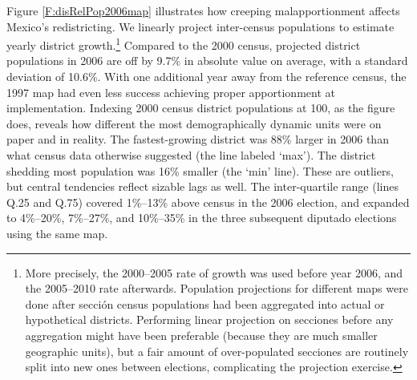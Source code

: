 \documentclass[letter,12pt]{article}
\begin{document}
Figure \ref{F:disRelPop2006map} illustrates how creeping malapportionment affects Mexico's redistricting. We linearly project inter-census populations to estimate yearly district growth.\footnote{More precisely, the 2000--2005 rate of growth was used before year 2006, and the 2005--2010 rate afterwards. Population projections for different maps were done after secci\'on census populations had been aggregated into actual or hypothetical districts. Performing linear projection on secciones before any aggregation might have been preferable (because they are much smaller geographic units), but a fair amount of over-populated secciones are routinely split into new ones between elections, complicating the projection exercise.} Compared to the 2000 census, projected district populations in 2006 are off by 9.7\% in absolute value on average, with a standard deviation of 10.6\%. With one additional year away from the reference census, the 1997 map had even less success achieving proper apportionment at implementation. Indexing 2000 census district populations at 100, as the figure does, reveals how different the most demographically dynamic units were on paper and in reality. The fastest-growing district was 88\% larger in 2006 than what census data otherwise suggested (the line labeled `max'). The district shedding most population was 16\% smaller (the `min' line). These are outliers, but central tendencies reflect sizable lags as well. The inter-quartile range (lines Q.25 and Q.75) covered 1\%--13\% above census in the 2006 election, and expanded to 4\%--20\%, 7\%--27\%, and 10\%--35\% in the three subsequent diputado elections using the same map.
 

\end{document}
